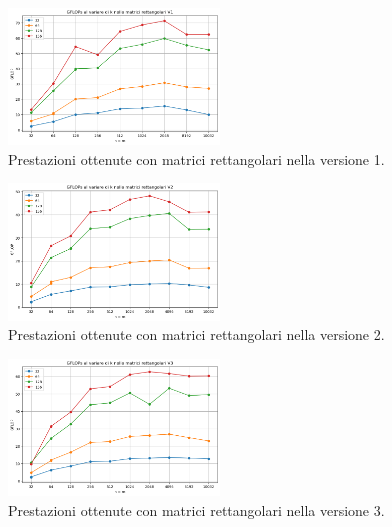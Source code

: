 \documentclass[conference]{IEEEtran}
\begin{document}
\begin{figure}[H]
    \centering
    \includegraphics[width=0.5\textwidth]{resources/gpu_matrix_rect_perfv1.png}
    \caption{Prestazioni ottenute con matrici rettangolari nella versione 1.}
    \label{fig:rect_matrix_v1}
\end{figure}
\begin{figure}[H]
    \centering
    \includegraphics[width=0.5\textwidth]{resources/gpu_matrix_rect_perfv2.png}
    \caption{Prestazioni ottenute con matrici rettangolari nella versione 2.}
    \label{fig:rect_matrix_v2}
\end{figure}
\begin{figure}[H]
    \centering
    \includegraphics[width=0.5\textwidth]{resources/gpu_matrix_rect_perfv3.png}
    \caption{Prestazioni ottenute con matrici rettangolari nella versione 3.}
    \label{fig:rect_matrix_v3}
\end{figure}
\end{document}
